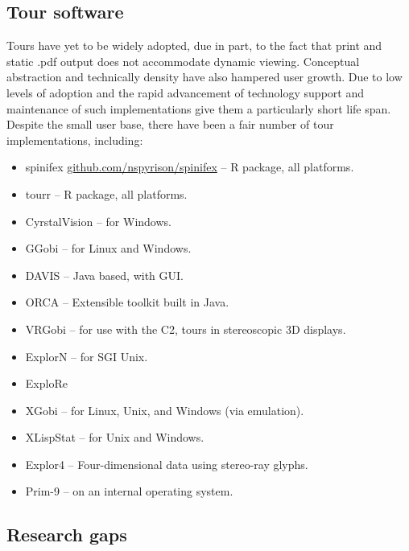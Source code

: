 \documentclass{template/monashthesis}
\begin{document}
\hypertarget{tour-software}{%
\subsection{Tour software}\label{tour-software}}

Tours have yet to be widely adopted, due in part, to the fact that print and static .pdf output does not accommodate dynamic viewing. Conceptual abstraction and technically density have also hampered user growth. Due to low levels of adoption and the rapid advancement of technology support and maintenance of such implementations give them a particularly short life span. Despite the small user base, there have been a fair number of tour implementations, including:

\begin{itemize}
\tightlist
\item
  spinifex \href{https://github.com/nspyrison/spinifex}{github.com/nspyrison/spinifex} -- R package, all platforms.
\item
  tourr \autocite{wickham_tourr_2011} -- R package, all platforms.
\item
  CyrstalVision \autocite{wegman_visual_2003} -- for Windows.
\item
  GGobi \autocite{swayne_ggobi:_2003} -- for Linux and Windows.
\item
  DAVIS \autocite{huh_davis:_2002} -- Java based, with GUI.
\item
  ORCA \autocite{sutherland_orca:_2000} -- Extensible toolkit built in Java.
\item
  VRGobi \autocite{nelson_xgobi_1998} -- for use with the C2, tours in stereoscopic 3D displays.
\item
  ExplorN \autocite{carr_explorn:_1996} -- for SGI Unix.
\item
  ExploRe \autocite{hardle_xplore:_1995}
\item
  XGobi \autocite{swayne_xgobi:_1991} -- for Linux, Unix, and Windows (via emulation).
\item
  XLispStat \autocite{tierney_lisp-stat:_1990} -- for Unix and Windows.
\item
  Explor4 \autocite{carr_explor4:_1988} -- Four-dimensional data using stereo-ray glyphs.
\item
  Prim-9 \autocite{asimov_grand_1985,fisherkeller_prim-9:_1974} -- on an internal operating system.
\end{itemize}

\hypertarget{research-gaps}{%
\subsection{Research gaps}\label{research-gaps}}
\end{document}
